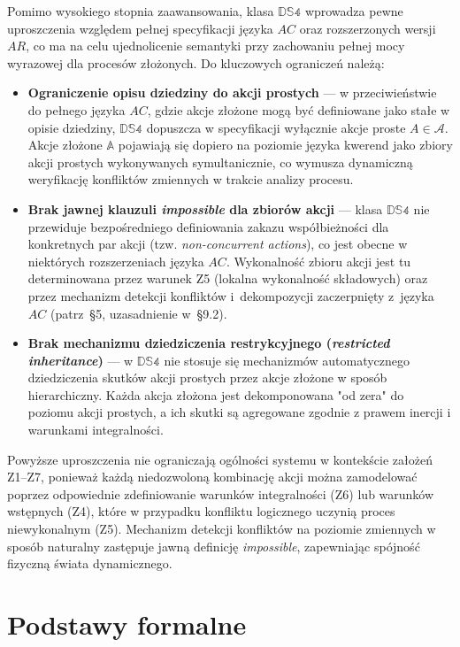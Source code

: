\documentclass[11pt,a4paper]{article}
\theoremstyle{definition}
\begin{document}
Pomimo wysokiego stopnia zaawansowania, klasa $\mathbb{DS4}$ wprowadza pewne uproszczenia względem pełnej specyfikacji języka $AC$ oraz rozszerzonych wersji $AR$, co ma na celu ujednolicenie semantyki przy zachowaniu pełnej mocy wyrazowej dla procesów złożonych. Do kluczowych ograniczeń należą:\begin{itemize}\item \textbf{Ograniczenie opisu dziedziny do akcji prostych} --- w przeciwieństwie do pełnego języka $AC$, gdzie akcje złożone mogą być definiowane jako stałe w opisie dziedziny, $\mathbb{DS4}$ dopuszcza w specyfikacji wyłącznie akcje proste $A \in \mathcal{A}$. Akcje złożone $\mathbb{A}$ pojawiają się dopiero na poziomie języka kwerend jako zbiory akcji prostych wykonywanych symultanicznie, co wymusza dynamiczną weryfikację konfliktów zmiennych w trakcie analizy procesu.\item \textbf{Brak jawnej klauzuli \textit{impossible} dla zbiorów akcji} --- klasa $\mathbb{DS4}$ nie przewiduje bezpośredniego definiowania zakazu współbieżności dla konkretnych par akcji (tzw. \textit{non-concurrent actions}), co jest obecne w niektórych rozszerzeniach języka $AC$. Wykonalność zbioru akcji jest tu determinowana przez warunek Z5 (lokalna wykonalność składowych) oraz przez mechanizm detekcji konfliktów i~dekompozycji zaczerpnięty z~języka~$AC$ (patrz~\S5, uzasadnienie w~\S9.2).

\item \textbf{Brak mechanizmu dziedziczenia restrykcyjnego (\textit{restricted inheritance})} --- w $\mathbb{DS4}$ nie stosuje się mechanizmów automatycznego dziedziczenia skutków akcji prostych przez akcje złożone w sposób hierarchiczny. Każda akcja złożona jest dekomponowana "od zera" do poziomu akcji prostych, a ich skutki są agregowane zgodnie z prawem inercji i warunkami integralności.
\end{itemize}Powyższe uproszczenia nie ograniczają ogólności systemu w kontekście założeń Z1--Z7, ponieważ każdą niedozwoloną kombinację akcji można zamodelować poprzez odpowiednie zdefiniowanie warunków integralności (Z6) lub warunków wstępnych (Z4), które w przypadku konfliktu logicznego uczynią proces niewykonalnym (Z5). Mechanizm detekcji konfliktów na poziomie zmiennych w sposób naturalny zastępuje jawną definicję \textit{impossible}, zapewniając spójność fizyczną świata dynamicznego.

\section{Podstawy formalne}
\end{document}
